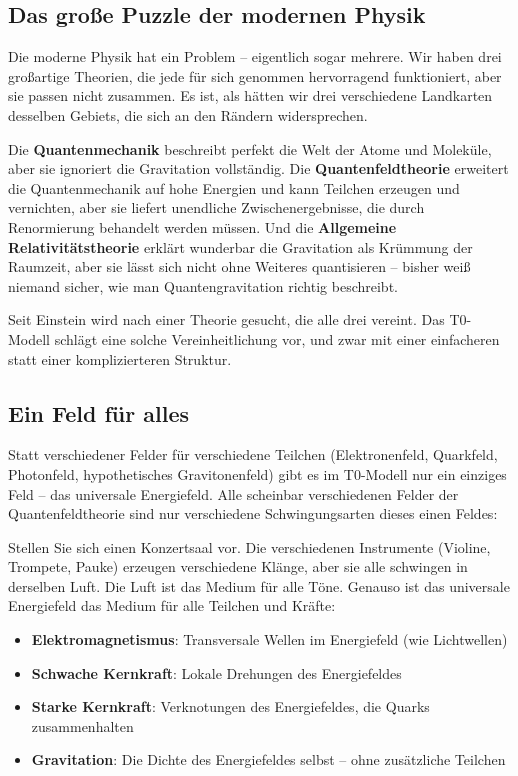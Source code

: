 	\subsection{Das große Puzzle der modernen Physik}
	
	Die moderne Physik hat ein Problem -- eigentlich sogar mehrere. Wir haben drei großartige Theorien, die jede für sich genommen hervorragend funktioniert, aber sie passen nicht zusammen. Es ist, als hätten wir drei verschiedene Landkarten desselben Gebiets, die sich an den Rändern widersprechen.
	
	Die \textbf{Quantenmechanik} beschreibt perfekt die Welt der Atome und Moleküle, aber sie ignoriert die Gravitation vollständig. Die \textbf{Quantenfeldtheorie} erweitert die Quantenmechanik auf hohe Energien und kann Teilchen erzeugen und vernichten, aber sie liefert unendliche Zwischenergebnisse, die durch Renormierung behandelt werden müssen. Und die \textbf{Allgemeine Relativitätstheorie} erklärt wunderbar die Gravitation als Krümmung der Raumzeit, aber sie lässt sich nicht ohne Weiteres quantisieren -- bisher weiß niemand sicher, wie man Quantengravitation richtig beschreibt.
	
	Seit Einstein wird nach einer Theorie gesucht, die alle drei vereint. Das T0-Modell schlägt eine solche Vereinheitlichung vor, und zwar mit einer einfacheren statt einer komplizierteren Struktur.
	
	\subsection{Ein Feld für alles}
	
	Statt verschiedener Felder für verschiedene Teilchen (Elektronenfeld, Quarkfeld, Photonfeld, hypothetisches Gravitonenfeld) gibt es im T0-Modell nur ein einziges Feld -- das universale Energiefeld. Alle scheinbar verschiedenen Felder der Quantenfeldtheorie sind nur verschiedene Schwingungsarten dieses einen Feldes:
	
	\begin{important}
		Stellen Sie sich einen Konzertsaal vor. Die verschiedenen Instrumente (Violine, Trompete, Pauke) erzeugen verschiedene Klänge, aber sie alle schwingen in derselben Luft. Die Luft ist das Medium für alle Töne. Genauso ist das universale Energiefeld das Medium für alle Teilchen und Kräfte:
		\begin{itemize}
			\item \textbf{Elektromagnetismus}: Transversale Wellen im Energiefeld (wie Lichtwellen)
			\item \textbf{Schwache Kernkraft}: Lokale Drehungen des Energiefeldes
			\item \textbf{Starke Kernkraft}: Verknotungen des Energiefeldes, die Quarks zusammenhalten
			\item \textbf{Gravitation}: Die Dichte des Energiefeldes selbst -- ohne zusätzliche Teilchen
		\end{itemize}
	\end{important}
	
